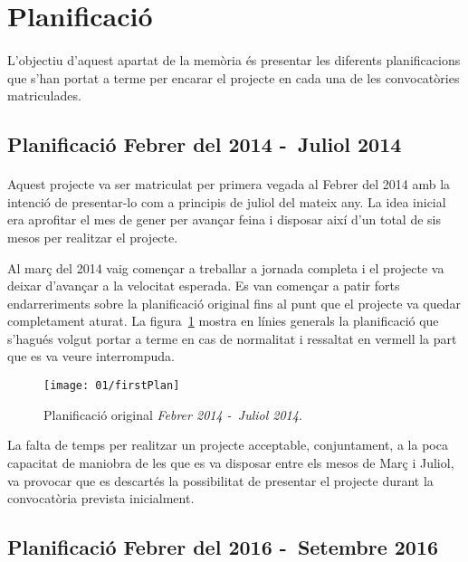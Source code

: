 \section{Planificació}

    \paragraph{}
    L'objectiu d'aquest apartat de la memòria és presentar les diferents planificacions que s'han portat a terme per encarar el projecte en cada una de les convocatòries matriculades.

    \subsection{Planificació Febrer del 2014 -\ Juliol 2014}

        \paragraph{}
        Aquest projecte va ser matriculat per primera vegada al Febrer del 2014 amb la intenció de presentar-lo com a principis de juliol del mateix any. La idea inicial era aprofitar el mes de gener per avançar feina i disposar així d’un total de sis mesos per realitzar el projecte.

        Al març del 2014 vaig començar a treballar a jornada completa i el projecte va deixar d’avançar a la velocitat esperada. Es van començar a patir forts endarreriments sobre la planificació original fins al punt que el projecte va quedar completament aturat. La figura~\ref{fig:firstPlan} mostra en línies generals la planificació que s’hagués volgut portar a terme en cas de normalitat i ressaltat en vermell la part que es va veure interrompuda.

        \begin{figure}[h]
                \texttt{[image: 01/firstPlan]}
                \centering
                \caption{Planificació original \emph{Febrer 2014 -\ Juliol 2014}.\label{fig:firstPlan}}
        \end{figure}

        La falta de temps per realitzar un projecte acceptable, conjuntament, a la poca capacitat de maniobra de les que es va disposar entre els mesos de Març i Juliol, va provocar que es descartés la possibilitat de presentar el projecte durant la convocatòria prevista inicialment.

    \subsection{Planificació Febrer del 2016 -\ Setembre 2016}

